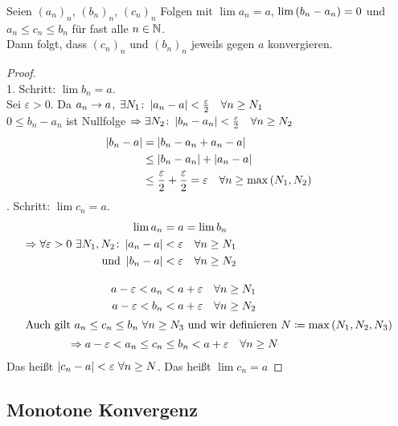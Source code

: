\begin{satz}
    \label{satz:sandwich}
    Seien $(a_n)_n$, $(b_n)_n$, $(c_n)_n$ Folgen mit $\lim a_n = a$, $\lim \left(b_n-a_n\right) = 0$ und $a_n \leq c_n \leq b_n$ für fast alle $n\in\mathbb{N}$.\\
    Dann folgt, dass $(c_n)_n$ und $(b_n)_n$ jeweils gegen $a$ konvergieren.
    \begin{proof}
        ~\\
        1. Schritt: $\lim b_n = a$.\\[10pt]
        Sei $\varepsilon > 0$. Da $a_n\rightarrow{} a$, $\exists N_1\colon \left|a_n-a\right| < \frac{\varepsilon}{2}\quad\forall n\geq N_1$\\
        $0\leq b_n-a_n$ ist Nullfolge $\Rightarrow{} \exists N_2\colon \left|b_n-a_n\right| < \frac{\varepsilon}{2}\quad\forall n\geq N_2$\\
        \begin{align*}
            \left|b_n-a\right| &= \left|b_n-a_n+a_n-a\right|\\
            &\leq \left|b_n - a_n\right| + \left|a_n-a\right|\\
            &\leq \frac{\varepsilon}{2} + \frac{\varepsilon}{2} = \varepsilon\quad \forall n\geq \max\left(N_1, N_2\right)
        \end{align*}
        . Schritt: $\lim c_n = a$.
        \begin{align*}
            \lim a_n &= a = \lim b_n\\
            \Rightarrow{} \forall\varepsilon > 0~\exists N_1, N_2\colon \left|a_n-a\right| &< \varepsilon \quad\forall n\geq N_1\\
            \text{ und } \left|b_n-a\right| &< \varepsilon \quad\forall n\geq N_2\\[10pt]
            a-\varepsilon < a_n &< a + \varepsilon\quad\forall n\geq N_1\\
            a-\varepsilon < b_n &< a + \varepsilon\quad\forall n\geq N_2\\
            \intertext{Auch gilt $a_n \leq c_n \leq b_n~\forall n\geq N_3$ und wir definieren $N\coloneqq\max\left(N_1, N_2, N_3\right)$}
            \Rightarrow{} a-\varepsilon < a_n \leq c_n &\leq b_n < a + \varepsilon\quad\forall n\geq N
        \end{align*}
        Das heißt $\left|c_n-a\right| < \varepsilon~\forall n\geq N$. Das heißt $\lim c_n = a$\qedhere
    \end{proof}
\end{satz}

\subsection{Monotone Konvergenz}

